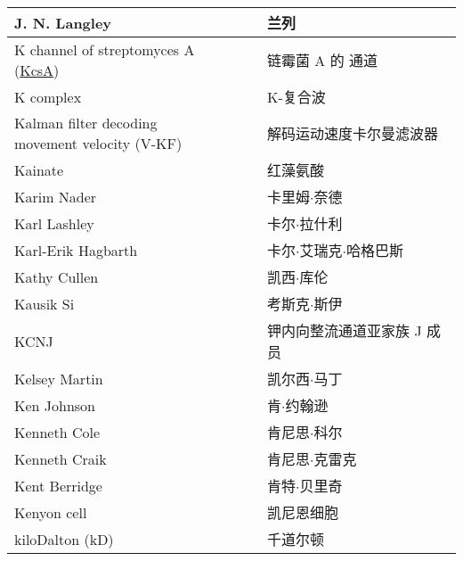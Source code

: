 \begin{longtable}{lll}
	\midrule
	J. N. Langley   && 兰列  \\
	
	\midrule
	K channel of streptomyces A (\href{https://en.wikipedia.org/wiki/KcsA_potassium_channel}{KcsA})  && 链霉菌 A 的 \ce{K+} 通道  \\
	
	\midrule
	K complex   && K-复合波  \\
	
	\midrule
	\makecell[l]{Kalman filter decoding \\movement velocity (V-KF)}   && 解码运动速度卡尔曼滤波器  \\
	
	\midrule
	Kainate   && 红藻氨酸  \\
	
	\midrule
	Karim Nader   && 卡里姆$\cdot$奈德  \\
	
	\midrule
	Karl Lashley  && 卡尔$\cdot$拉什利  \\
	
	\midrule
	Karl-Erik Hagbarth  && 卡尔$\cdot$艾瑞克$\cdot$哈格巴斯  \\
	
	\midrule
	Kathy Cullen  && 凯西$\cdot$库伦  \\
	
	\midrule
	Kausik Si  && 考斯克$\cdot$斯伊  \\
	
	\midrule
	KCNJ   && 钾内向整流通道亚家族 J 成员  \\
	
	\midrule
	Kelsey Martin   && 凯尔西$\cdot$马丁  \\
	
	\midrule
	Ken Johnson   && 肯$\cdot$约翰逊  \\
	
	\midrule
	Kenneth Cole   && 肯尼思$\cdot$科尔  \\
	
	\midrule
	Kenneth Craik   && 肯尼思$\cdot$克雷克  \\
	
	\midrule
	Kent Berridge   && 肯特$\cdot$贝里奇  \\
	
	\midrule
	Kenyon cell   && 凯尼恩细胞  \\
	
	\midrule
	kiloDalton (kD)   && 千道尔顿  \\
	

\end{longtable}

